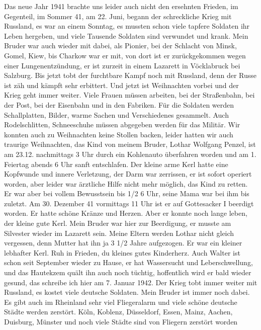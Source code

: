 \documentclass[a5paper,11pt,openany]{book}
\newcommand{\seite}[1]{\leavevmode\marginpar{\footnotesize\itshape\raggedright #1}\ignorespaces}
\begin{document}
\seite{51}
Das neue Jahr 1941 brachte uns leider auch nicht den ersehnten Frieden,
  im Gegenteil, im Sommer 41, am 22. Juni, begann der schreckliche Krieg mit Russland,
  es war an einem Sonntag, es mussten schon viele tapfere Soldaten ihr Leben hergeben,
  und viele Tausende Soldaten sind verwundet und krank.
Mein Bruder war auch wieder mit dabei, als Pionier, bei der Schlacht von Minsk,
  Gomel, Kiew, bis Charkow war er mit, von dort ist er
\seite{52}
zurückgekommen wegen einer Lungenentzündung,
  er ist zurzeit in einem Lazarett in Vöcklabruck bei Salzburg.
Bis jetzt tobt der furchtbare Kampf noch mit Russland, denn der Russe ist zäh und kämpft sehr erbittert.
Und jetzt ist Weihnachten vorbei und der Krieg geht immer weiter.
Viele Frauen müssen arbeiten, bei der Straßenbahn, bei der Post, bei der Eisenbahn und in den Fabriken.
Für die Soldaten werden Schallplatten, Bilder, warme Sachen und
\seite{53}
Verschiedenes gesammelt.
Auch Rodelschlitten, Schneeschuhe müssen abgegeben werden für das Militär.
Wir konnten auch zu Weihnachten keine Stollen backen,
  leider hatten wir auch traurige Weihnachten, das Kind von meinem Bruder,
  Lothar Wolfgang Penzel, ist am 23.12. nachmittags 3 Uhr durch ein Kohlenauto überfahren worden
  und am 1. Feiertag abends 6 Uhr sanft entschlafen.
Der kleine arme Kerl hatte eine Kopfwunde und innere Verletzung, der Darm war zerrissen, er ist
\seite{54}
sofort operiert worden, aber leider war ärztliche Hilfe nicht mehr möglich, das Kind zu retten.
Er war aber bei vollem Bewusstsein bis 1/2 6 Uhr, seine Mama war bei ihm bis zuletzt.
Am 30. Dezember 41 vormittags 11 Uhr ist er auf Gottesacker I beerdigt worden.
Er hatte schöne Kränze und Herzen.
Aber er konnte noch lange leben, der kleine gute Kerl.
Mein Bruder war hier zur Beerdigung, er musste am Silvester wieder im Lazarett sein.
Meine Eltern werden Lothar nicht gleich vergessen,
\seite{55}
denn Mutter hat ihn ja 3 1/2 Jahre aufgezogen.
Er war ein kleiner lebhafter Kerl.
Ruh in Frieden, du kleines gutes Kinderherz.
Auch Walter ist schon seit September wieder zu Hause,
  er hat Wassersucht und Leberschwellung, und das Hautekzem quält ihn auch noch tüchtig, hoffentlich wird er bald wieder gesund,
  das schreibe ich hier am 7. Januar 1942.
Der Krieg tobt immer weiter mit Russland, es kostet viele deutsche Soldaten.
Mein Bruder ist immer noch dabei.
Es gibt auch im Rheinland sehr viel Fliegeralarm
\seite{56}
und viele schöne deutsche Städte werden zerstört.
Köln, Koblenz, Düsseldorf, Essen, Mainz, Aachen, Duisburg, Münster und noch viele Städte sind von Fliegern zerstört worden
\end{document}
